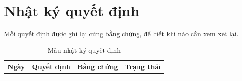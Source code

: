 \section{Nhật ký quyết định}

Mỗi quyết định được ghi lại cùng bằng chứng, để biết khi nào cần xem xét lại.

\begin{table}[H]
  \centering
  \caption{Mẫu nhật ký quyết định}
  \begin{tabularx}{\linewidth}{l X X l}
    \toprule
    \textbf{Ngày} & \textbf{Quyết định} & \textbf{Bằng chứng} & \textbf{Trạng thái} \\
    \midrule
     &  &  &  \\
    \bottomrule
  \end{tabularx}
\end{table}

